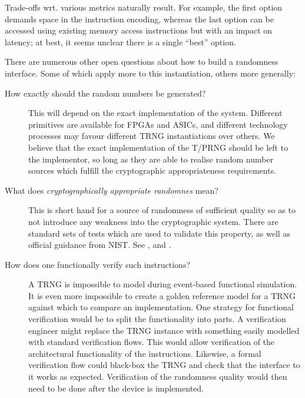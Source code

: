 \begin{description}
      \noindent
      Trade-offs wrt. various metrics naturally result.  For example,
      the first option demands space in the instruction encoding, 
      whereas
      the last  option can be accessed using existing memory access instructions but with an impact on latency;
      at best, it seems unclear there is a single ``best'' option.

    There are numerous other open questions about how to build a
    randomness interface.
    Some of which apply more to this instantiation, others more generally:

    \begin{description}
    \item[How exactly should the random numbers be generated?]
    This will depend on the exact implementation of the system.  Different
    primitives are available for FPGAs and ASICs, and different technology
    processes may favour different TRNG instantiations over others.  We
    believe that the exact implementation of the T/PRNG should be left to the
    implementor, so long as they are able to realise random number sources
    which fulfill the cryptographic appropriateness requirements.

    \item[What does {\em cryptographically appropriate randomnes} mean?]
    This is short hand for a source of randomness of sufficient quality so as
    to not introduce any weakness into the cryptographic system.  There are
    standard sets of tests which are used to validate this property, as well
    as official guidance from NIST.
    See \cite{SCARV:NIST:SP:800_90a},
        \cite{SCARV:NIST:SP:800_90b} and
        \cite{SCARV:NIST:SP:800_90c}.

    \item[How does one functionally verify such instructions?]
    A TRNG is impossible to model during event-based functional simulation.
    It is even more impossible to create a golden reference model for a TRNG
    against which to compare an implementation.  One strategy for functional
    verification would be to split the functionality into parts. A
    verification engineer might replace the TRNG instance with something
    easily modelled with standard verification flows. This would allow
    verification of the architectural functionality of the instructions.
    Likewise, a formal verification flow could black-box the TRNG and check
    that the interface to it works as expected.  Verification of the
    randomness quality would then need to be done after the device is
    implemented.


\end{description}
\end{description}
